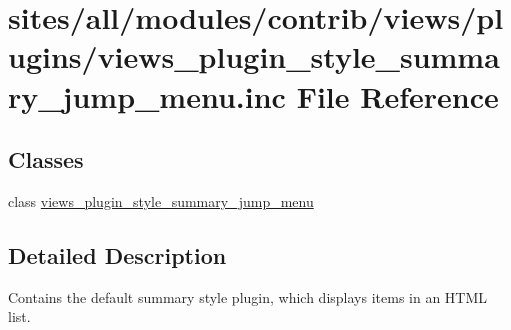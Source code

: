 \hypertarget{views__plugin__style__summary__jump__menu_8inc}{
\section{sites/all/modules/contrib/views/plugins/views\_\-plugin\_\-style\_\-summary\_\-jump\_\-menu.inc File Reference}
\label{views__plugin__style__summary__jump__menu_8inc}
}
\subsection*{Classes}
\begin{CompactItemize}
\item 
class \hyperlink{classviews__plugin__style__summary__jump__menu}{views\_\-plugin\_\-style\_\-summary\_\-jump\_\-menu}
\end{CompactItemize}


\subsection{Detailed Description}
Contains the default summary style plugin, which displays items in an HTML list. 